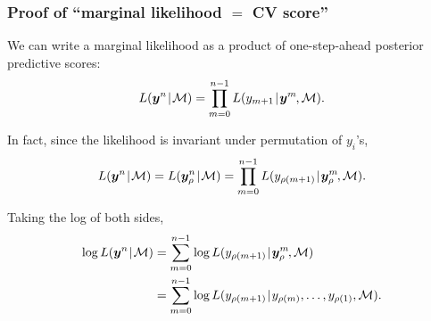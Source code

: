 \documentclass[18pt]{beamer}
\newcommand{\defineTightSpacing}{%
	\setlength{\abovedisplayskip}{.25\baselineskip}%
	\setlength{\belowdisplayskip}{.25\baselineskip}%
}
\renewcommand{\textsc}[1]{{\small \MakeUppercase{#1}}}
\newcommand{\given}{\thinnerspace | \thinnerspace}
\newcommand{\thinnerspace}{\mskip.5\thinmuskip}
\newcommand{\negthinnerspace}{\mskip-.5\thinmuskip}
\newcommand{\likelihood}{L}
\newcommand{\by}{\bm{y}}
\newcommand{\loss}{\mathcal{L}}
\newcommand{\modelSymbol}{\mathcal{M}}
\newcommand{\permutation}{\rho}
\newcommand{\trainingSize}{m}
\newcommand{\testSampleIndex}{i}
\newcommand{\testOutcome}{y_{\permutation(\testSampleIndex)}} %
\newcommand{\testOutcomePredicted}{\widehat{y}_{\permutation(\testSampleIndex)}^{\, \trainingSize}}
\begin{document}
\begin{frame}
\frametitle{Proof of ``marginal likelihood $=$ {\large CV} score''}
We can write a marginal likelihood as a product of one-step-ahead posterior predictive scores:
\vspace*{-.3\baselineskip}
\begin{equation*} \defineTightSpacing%
\likelihood(\by^n \given \modelSymbol)
	= \prod_{m = 0}^{n - 1} \likelihood(y_{\trainingSize + 1} \given \by^\trainingSize\negthinnerspace, \modelSymbol).
\end{equation*}

In fact, since the likelihood is invariant under permutation of $y_i$'s,
\vspace*{-.15\baselineskip}
\begin{equation*} \defineTightSpacing%
\likelihood(\by^n \given \modelSymbol)
	= \likelihood(\by_{\permutation}^n \given \modelSymbol)
	= \prod_{m = 0}^{n - 1} \likelihood(y_{\permutation(\trainingSize + 1)} \given \by_\permutation^\trainingSize\negthinnerspace, \modelSymbol).
\end{equation*}

Taking the log of both sides, 
\begin{equation*} \defineTightSpacing%
\begin{aligned}
\log \likelihood(\by^n \given \modelSymbol)
	&= \sum_{m = 0}^{n - 1} \log \likelihood(y_{\permutation(\trainingSize + 1)} \given \by_\permutation^\trainingSize\negthinnerspace, \modelSymbol) \\
	&= \sum_{m = 0}^{n - 1} \log \likelihood(y_{\permutation(\trainingSize + 1)} \given y_{\permutation(\trainingSize)}, \ldots, y_{\permutation(1)}, \modelSymbol).
\end{aligned}
\end{equation*}

\end{frame}
\end{document}
